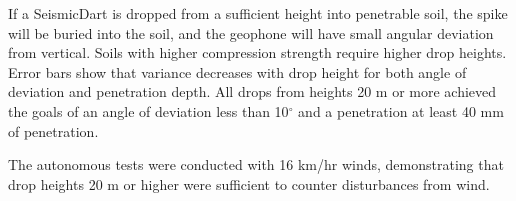 If a SeismicDart is dropped from a sufficient height into penetrable soil, the spike will be buried into the soil, and the geophone will have small angular deviation from vertical. Soils with higher compression strength require higher drop heights. Error bars show that variance decreases with drop height for both angle of deviation and penetration depth.  
 All drops from heights 20 m or more achieved the goals of an angle of deviation less than 10$^\circ$ and a penetration at least 40 mm of penetration.   

The autonomous tests were conducted with 16 km/hr winds, demonstrating that drop heights 20 m or higher were sufficient to counter disturbances from wind. %








